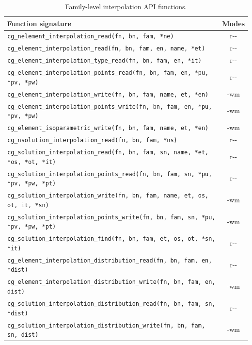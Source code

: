 \documentclass[11pt,letterpaper]{article}
\begin{document}
\begin{table}[htbp]
\centering
\small
{}
\begin{tabular}{@{} l c @{}}
\toprule
\textbf{Function signature} & \textbf{Modes} \\
\midrule
\texttt{cg\_nelement\_interpolation\_read(fn, bn, fam, *ne)} & r{-}{-} \\
\texttt{cg\_element\_interpolation\_read(fn, bn, fam, en, name, *et)} & r{-}{-} \\
\texttt{cg\_element\_interpolation\_type\_read(fn, bn, fam, en, *it)} & r{-}{-} \\
\texttt{cg\_element\_interpolation\_points\_read(fn, bn, fam, en, *pu, *pv, *pw)} & r{-}{-} \\
\texttt{cg\_element\_interpolation\_write(fn, bn, fam, name, et, *en)} & {-}wm \\
\texttt{cg\_element\_interpolation\_points\_write(fn, bn, fam, en, *pu, *pv, *pw)} & {-}wm \\
\texttt{cg\_element\_isoparametric\_write(fn, bn, fam, name, et, *en)} & {-}wm \\
\addlinespace
\texttt{cg\_nsolution\_interpolation\_read(fn, bn, fam, *ns)} & r{-}{-} \\
\texttt{cg\_solution\_interpolation\_read(fn, bn, fam, sn, name, *et, *os, *ot, *it)} & r{-}{-} \\
\texttt{cg\_solution\_interpolation\_points\_read(fn, bn, fam, sn, *pu, *pv, *pw, *pt)} & r{-}{-} \\
\texttt{cg\_solution\_interpolation\_write(fn, bn, fam, name, et, os, ot, it, *sn)} & {-}wm \\
\texttt{cg\_solution\_interpolation\_points\_write(fn, bn, fam, sn, *pu, *pv, *pw, *pt)} & {-}wm \\
\texttt{cg\_solution\_interpolation\_find(fn, bn, fam, et, os, ot, *sn, *it)} & r{-}{-} \\
\addlinespace
\texttt{cg\_element\_interpolation\_distribution\_read(fn, bn, fam, en, *dist)} & r{-}{-} \\
\texttt{cg\_element\_interpolation\_distribution\_write(fn, bn, fam, en, dist)} & {-}wm \\
\texttt{cg\_solution\_interpolation\_distribution\_read(fn, bn, fam, sn, *dist)} & r{-}{-} \\
\texttt{cg\_solution\_interpolation\_distribution\_write(fn, bn, fam, sn, dist)} & {-}wm \\
\bottomrule
\end{tabular}
\caption{Family-level interpolation API functions.}
\label{tab:family-api}
\end{table}
\end{document}
